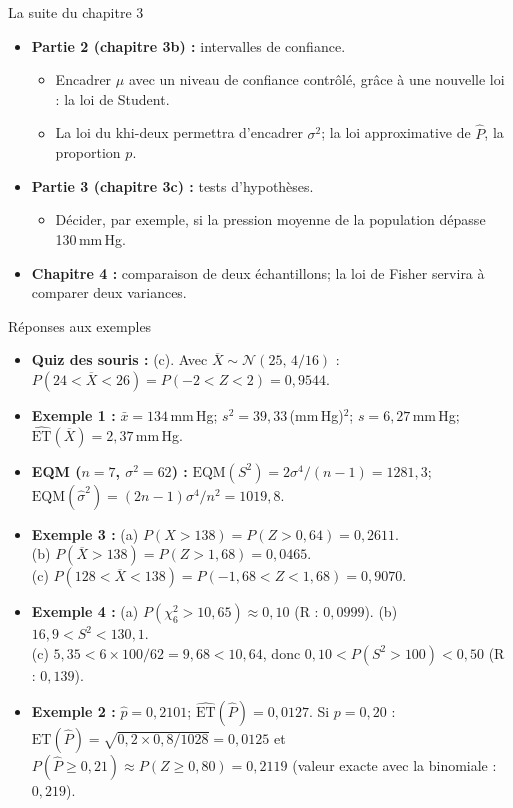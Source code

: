 \documentclass{BeamerTemplate}
\begin{document}
\begin{frame}[t]{La suite du chapitre 3}
  \begin{itemize}\itemsep 5mm
    \item \textbf{Partie 2 (chapitre 3b) :} \alert{intervalles de confiance}.
      \begin{itemize}
        \item Encadrer $\mu$ avec un niveau de confiance contrôlé, grâce à une nouvelle loi : la \alert{loi de Student}.
        \item La loi du khi-deux permettra d'encadrer $\sigma^2$; la loi approximative de $\widehat{P}$, la proportion $p$.
      \end{itemize}
    \item \textbf{Partie 3 (chapitre 3c) :} \alert{tests d'hypothèses}.
      \begin{itemize}
        \item Décider, par exemple, si la pression moyenne de la population dépasse 130\,mm\,Hg.
      \end{itemize}
    \item \textbf{Chapitre 4 :} comparaison de \alert{deux échantillons}; la \alert{loi de Fisher} servira à comparer deux variances.
  \end{itemize}
\end{frame}

\begin{frame}[t]{Réponses aux exemples}
  \footnotesize
  \begin{itemize}\itemsep 1.5mm
    \item \textbf{Quiz des souris :} (c). Avec $\overline{X} \sim \mathcal{N}(25,\, 4/16)$ : $P(24 < \overline{X} < 26) = P(-2 < Z < 2) = 0{,}9544$.
    \item \textbf{Exemple 1 :} $\bar{x} = 134$\,mm\,Hg; $s^2 = 39{,}33$\,(mm\,Hg)$^2$; $s = 6{,}27$\,mm\,Hg; $\widehat{\text{ET}}(\overline{X}) = 2{,}37$\,mm\,Hg.
    \item \textbf{EQM ($n = 7$, $\sigma^2 = 62$) :} $\text{EQM}(S^2) = 2\sigma^4/(n-1) = 1281{,}3$; \; $\text{EQM}(\hat{\sigma}^2) = (2n-1)\sigma^4/n^2 = 1019{,}8$.
    \item \textbf{Exemple 3 :} (a) $P(X > 138) = P(Z > 0{,}64) = 0{,}2611$.\\
      (b) $P(\overline{X} > 138) = P(Z > 1{,}68) = 0{,}0465$.\\
      (c) $P(128 < \overline{X} < 138) = P(-1{,}68 < Z < 1{,}68) = 0{,}9070$.
    \item \textbf{Exemple 4 :} (a) $P(\chi^2_6 > 10{,}65) \approx 0{,}10$ (R : $0{,}0999$). \; (b) $16{,}9 < S^2 < 130{,}1$.\\
      (c) $5{,}35 < 6 \times 100/62 = 9{,}68 < 10{,}64$, donc $0{,}10 < P(S^2 > 100) < 0{,}50$ (R : $0{,}139$).
    \item \textbf{Exemple 2 :} $\hat{p} = 0{,}2101$; $\widehat{\text{ET}}(\widehat{P}) = 0{,}0127$.
      Si $p = 0{,}20$ : $\text{ET}(\widehat{P}) = \sqrt{0{,}2 \times 0{,}8/1028} = 0{,}0125$ et\\
      $P(\widehat{P} \ge 0{,}21) \approx P(Z \ge 0{,}80) = 0{,}2119$ (valeur exacte avec la binomiale : $0{,}219$).
  \end{itemize}
\end{frame}
\end{document}
